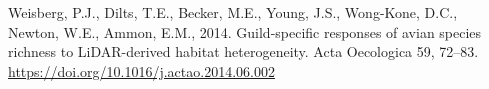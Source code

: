 \documentclass[
  12pt,
]{article}
\newlength{\cslhangindent}
\newlength{\cslentryspacingunit} %
\newenvironment{CSLReferences}[2] %
 {%
  \setlength{\parindent}{0pt}
  \ifodd #1
  \let\oldpar\par
  \def\par{\hangindent=\cslhangindent\oldpar}
  \fi
  \setlength{\parskip}{#2\cslentryspacingunit}
 }%
 {}
\begin{document}
\begin{CSLReferences}{1}{0}
\leavevmode{}%
Weisberg, P.J., Dilts, T.E., Becker, M.E., Young, J.S., Wong-Kone, D.C., Newton, W.E., Ammon, E.M., 2014. Guild-specific responses of avian species richness to {LiDAR}-derived habitat heterogeneity. Acta Oecologica 59, 72--83. \url{https://doi.org/10.1016/j.actao.2014.06.002}

\end{CSLReferences}

\pagebreak
\end{document}
